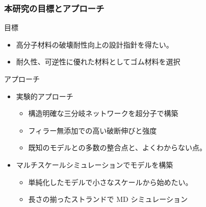 \documentclass[12pt, dvipdfmx]{beamer}
\begin{document}
\begin{frame}
    \frametitle{本研究の目標とアプローチ}
        \begin{block}{目標}
                \begin{itemize}
                    \item 高分子材料の破壊耐性向上の設計指針を得たい。
                    \item 耐久性、可逆性に優れた材料としてゴム材料を選択
                \end{itemize}
        \end{block}
		\begin{exampleblock}{アプローチ}
            \begin{itemize}
                \item 実験的アプローチ
                \begin{itemize}
                    \item 構造明確な\alert{三分岐}ネットワークを超分子で構築
                    \item フィラー無添加での\alert{高い破断伸びと強度}
                    \item 既知のモデルとの多数の整合点と、\alert{よくわからない点}。
                \end{itemize}
                \item マルチスケールシミュレーションで\color{red}モデル\color{black}を構築
                \begin{itemize}
                    \item 単純化したモデルで小さなスケールから始めたい。
                    \item \alert{長さの揃ったストランドで MD シミュレーション}
                \end{itemize}
            \end{itemize}
		\end{exampleblock}
\end{frame}
\end{document}
